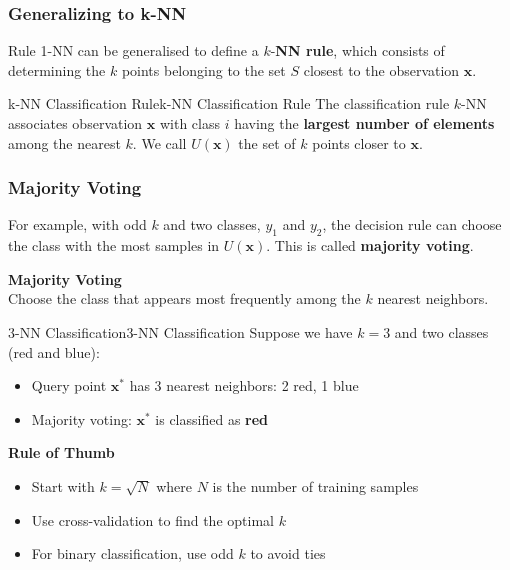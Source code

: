 \documentclass[a4paper]{article}
\theoremstyle{definition}
\begin{document}
\subsubsection{Generalizing to k-NN}
Rule 1-NN can be generalised to define a \( k \)-\textbf{NN rule}, which consists of determining the \( k \) points belonging to the set \( S \) closest to 
the observation \( \mathbf{x} \).
\begin{definition}{k-NN Classification Rule}{k-NN Classification Rule}
The classification rule \( k \)-NN associates observation \( \mathbf{x} \) with class \( i \) having the \textbf{largest number of elements} among 
the nearest \( k \). We call \( U(\mathbf{x}) \) the set of \( k \) points closer to \( \mathbf{x} \).
\end{definition}
\subsubsection{Majority Voting}
For example, with odd \( k \) and two classes, \( y_1 \) and \( y_2 \), the decision rule can choose the class with the most samples in 
\( U(\mathbf{x}) \). This is called \textbf{majority voting}.
\begin{tcolorbox}[
    colback=blue!15!white,
    colframe=blue!15!white,
    boxrule=0pt,
    arc=0pt,
    halign=center
]
    \textbf{Majority Voting}\\[0.5em]
    Choose the class that appears most frequently among the \( k \) nearest neighbors.
\end{tcolorbox}
\begin{example}{3-NN Classification}{3-NN Classification}
Suppose we have \( k = 3 \) and two classes (red and blue):
\begin{itemize}
    \item Query point \( \mathbf{x}^* \) has 3 nearest neighbors: 2 red, 1 blue
    \item Majority voting: \( \mathbf{x}^* \) is classified as \textbf{red}
\end{itemize}
\end{example}
\begin{tcolorbox}[
    colback=yellow!15!white,
    colframe=yellow!15!white,
    boxrule=0pt,
    arc=0pt,
    halign=center
]
    \textbf{Rule of Thumb}\\[0.5em]
    \begin{itemize}
        \item Start with \( k = \sqrt{N} \) where \( N \) is the number of training samples 
        \item Use cross-validation to find the optimal \( k \)
        \item For binary classification, use odd \( k \) to avoid ties
    \end{itemize}
\end{tcolorbox}
\end{document}
